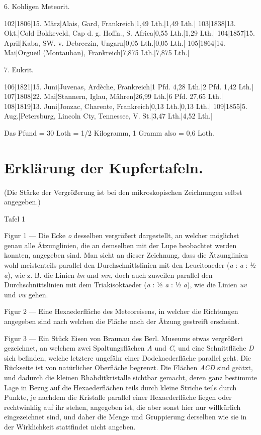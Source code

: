 \documentclass[a4paper, 11pt, oneside]{article}
\begin{document}
6. Kohligen Meteorit.  

102|1806|15. März|Alais, Gard, Frankreich|1,49 Lth.|1,49 Lth.|  
103|1838|13. Okt.|Cold Bokkeveld, Cap d. g. Hoffn., S. Africa|0,55 Lth.|1,29 Lth.|  
104|1857|15. April|Kaba, SW. v. Debreczin, Ungarn|0,05 Lth.|0,05 Lth.|  
105|1864|14. Mai|Orgueil (Montauban), Frankreich|7,875 Lth.|7,875 Lth.|  

7. Eukrit.  

106|1821|15. Juni|Juvenas, Ardèche, Frankreich|1 Pfd. 4,28 Lth.|2 Pfd. 1,42 Lth.|  
107|1808|22. Mai|Stannern, Iglau, Mähren|26,99 Lth.|6 Pfd. 27,65 Lth.|  
108|1819|13. Juni|Jonzac, Charente, Frankreich|0,13 Lth.|0,13 Lth.|  
109|1855|5. Aug.|Petersburg, Lincoln Cty, Tennessee, V. St.|3,47 Lth.|4,52 Lth.|  
  
Das Pfund = 30 Loth = 1/2 Kilogramm, 1 Gramm also = 0,6 Loth.
\clearpage
\section{Erklärung der Kupfertafeln.}
\paragraph{}
(Die Stärke der Vergrößerung ist bei den mikroskopischen Zeichnungen selbst angegeben.)

Tafel 1

Figur 1 — Die Ecke \emph{o} desselben vergrößert dargestellt, an welcher möglichst genau alle Ätzunglinien, die an demselben mit der Lupe beobachtet werden konnten, angegeben sind. Man sieht an dieser Zeichnung, dass die Ätzunglinien wohl meistenteils parallel den Durchschnittslinien mit den Leucitoaeder (\emph{a} : \emph{a} : ½ \emph{a}), wie z. B. die Linien \emph{lm} und \emph{mn}, doch auch zuweilen parallel den Durchschnittslinien mit dem Triakisoktaeder (\emph{a} : ½ \emph{a} : ½ \emph{a}), wie die Linien \emph{uv} und \emph{vw} gehen.

Figur 2 — Eine Hexaederfläche des Meteoreisens, in welcher die Richtungen angegeben sind nach welchen die Fläche nach der Ätzung gestreift erscheint.

Figur 3 — Ein Stück Eisen von Braunau des Berl. Museums etwas vergrößert gezeichnet, an welchem zwei Spaltungsflächen \emph{A} und \emph{C}, und eine Schnittfläche \emph{D} sich befinden, welche letztere ungefähr einer Dodekaederfläche parallel geht. Die Rückseite ist von natürlicher Oberfläche begrenzt. Die Flächen \emph{ACD} sind geätzt, und dadurch die kleinen Rhabditkristalle sichtbar gemacht, deren ganz bestimmte Lage in Bezug auf die Hexaederflächen teils durch kleine Striche teils durch Punkte, je nachdem die Kristalle parallel einer Hexaederfläche liegen oder rechtwinklig auf ihr stehen, angegeben ist, die aber sonst hier nur willkürlich eingezeichnet sind, und daher die Menge und Gruppierung derselben wie sie in der Wirklichkeit stattfindet nicht angeben.
\end{document}
